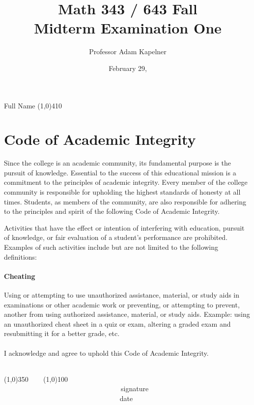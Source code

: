 \documentclass[12pt]{article}
\title{Math 343 / 643 Fall \the\year{} \\ Midterm Examination One}
\author{Professor Adam Kapelner}
\date{February 29, \the\year{}}
\begin{document}
\maketitle

\noindent Full Name \line(1,0){410}

\thispagestyle{empty}

\section*{Code of Academic Integrity}

\footnotesize
Since the college is an academic community, its fundamental purpose is the pursuit of knowledge. Essential to the success of this educational mission is a commitment to the principles of academic integrity. Every member of the college community is responsible for upholding the highest standards of honesty at all times. Students, as members of the community, are also responsible for adhering to the principles and spirit of the following Code of Academic Integrity.

Activities that have the effect or intention of interfering with education, pursuit of knowledge, or fair evaluation of a student's performance are prohibited. Examples of such activities include but are not limited to the following definitions:

\paragraph{Cheating} Using or attempting to use unauthorized assistance, material, or study aids in examinations or other academic work or preventing, or attempting to prevent, another from using authorized assistance, material, or study aids. Example: using an unauthorized cheat sheet in a quiz or exam, altering a graded exam and resubmitting it for a better grade, etc.\\
\\
\noindent I acknowledge and agree to uphold this Code of Academic Integrity. \\~\\

\begin{center}
\line(1,0){350} ~~~ \line(1,0){100}\\
~~~~~~~~~~~~~~~~~~~~~~~~~~~~~~~~~~signature~~~~~~~~~~~~~~~~~~~~~~~~~~~~~~~~~~~~~~~~~~~~~~~~~~~~~~~~~~~~~~ date
\end{center}

\normalsize
\end{document}
